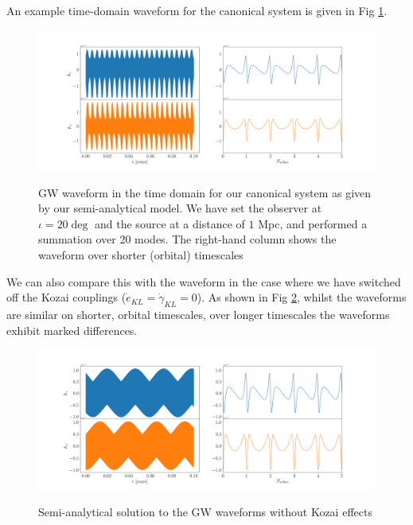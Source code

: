 \documentclass[a4paper,fleqn,usenatbib]{mnras}
\begin{document}
\noindent An example time-domain waveform for the canonical system is given in Fig \ref{fig:canonical_waveform}.
\begin{figure}
	\includegraphics[width=1\textwidth]{GW_canonical1.png} \\ 
	\medskip
	\caption{GW waveform in the time domain for our canonical system as given by our semi-analytical model. We have set the observer at $\iota = 20 \deg$ and the source at a distance of $1$ Mpc, and performed a summation over 20 modes. The right-hand column shows the waveform over shorter (orbital) timescales}
	\label{fig:canonical_waveform}
\end{figure}
We can also compare this with the waveform in the case where we have switched off the Kozai couplings ($\dot{e}_{KL} = \dot{\gamma}_{KL} = 0$). As shown in Fig \ref{fig:canonical_waveform_nokozai}, whilst the waveforms are similar on shorter, orbital timescales, over longer timescales the waveforms exhibit marked differences. \newline 
\begin{figure}
	\includegraphics[width=1\textwidth]{GW_canonical_noKozai.png} \\ 
	\medskip
	\caption{Semi-analytical solution to the GW waveforms without Kozai effects}
	\label{fig:canonical_waveform_nokozai}
\end{figure}
\end{document}
